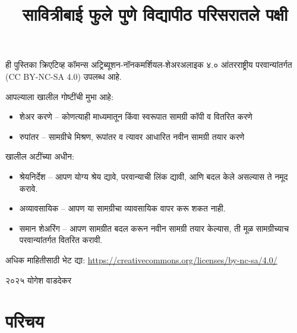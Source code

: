 \documentclass[a4paper,12pt,landscape]{memoir}
\title{सावित्रीबाई फुले पुणे विद्यापीठ परिसरातले पक्षी}
\author{}
\date{}
\begin{document}
\maketitle

\begin{center}
\vspace{1cm}
{\large ही पुस्तिका क्रिएटिव्ह कॉमन्स अट्रिब्यूशन-नॉनकमर्शियल-शेअरअलाइक ४.० आंतरराष्ट्रीय परवान्यांतर्गत ({\latintext CC BY-NC-SA 4.0}) उपलब्ध आहे.}

\vspace{0.5cm}
{\normalsize आपल्याला खालील गोष्टींची मुभा आहे:
\begin{itemize}
\item शेअर करणे -- कोणत्याही माध्यमातून किंवा स्वरूपात सामग्री कॉपी व वितरित करणे
\item रुपांतर -- सामग्रीचे मिश्रण, रूपांतर व त्यावर आधारित नवीन सामग्री तयार करणे
\end{itemize}

खालील अटींच्या अधीन:
\begin{itemize}
\item श्रेयनिर्देश -- आपण योग्य श्रेय द्यावे, परवान्याची लिंक द्यावी, आणि बदल केले असल्यास ते नमूद करावे.
\item अव्यावसायिक -- आपण या सामग्रीचा व्यावसायिक वापर करू शकत नाही.
\item समान शेअरिंग -- आपण सामग्रीत बदल करून नवीन सामग्री तयार केल्यास, ती मूळ सामग्रीच्याच परवान्यांतर्गत वितरित करावी.
\end{itemize}
}

\vspace{0.5cm}
{\small अधिक माहितीसाठी भेट द्या: 
{\latinmono \href{https://creativecommons.org/licenses/by-nc-sa/4.0/}{https://creativecommons.org/licenses/by-nc-sa/4.0/}}}

\vspace{1cm}

{\large{\latintext \textcopyright} २०२५ योगेश वाडदेकर}
\end{center}



\chapter*{परिचय}
\end{document}

